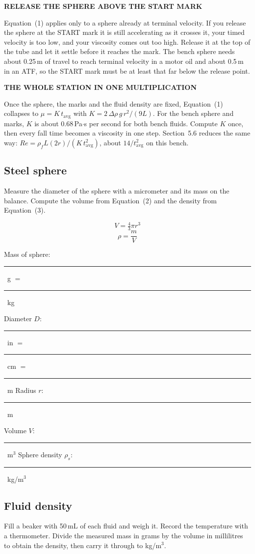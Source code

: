 \documentclass[11pt,a4paper]{article}
\newcommand{\bl}{\rule[-0.35em]{1.6cm}{0.4pt}}
\newcommand{\bll}{\rule[-0.35em]{2.6cm}{0.4pt}}
\newcommand{\noteh}[1]{{\footnotesize\bfseries\sffamily\color{ink3}\MakeUppercase{#1}}\par\vspace{2pt}}
\newcommand{\cautionh}[1]{{\footnotesize\bfseries\sffamily\color{cautionrule}\MakeUppercase{#1}}\par\vspace{2pt}}
\begin{document}
\begin{labcaution}
\cautionh{Release the sphere above the START mark}
Equation~(1) applies only to a sphere already at terminal velocity. If you release the sphere at
the START mark it is still accelerating as it crosses it, your timed velocity is too low, and
your viscosity comes out too high. Release it at the top of the tube and let it settle before it
reaches the mark. The bench sphere needs about 0.25\,m of travel to reach terminal velocity in a
motor oil and about 0.5\,m in an ATF, so the START mark must be at least that far below the
release point.
\end{labcaution}

\begin{labnote}
\noteh{The whole station in one multiplication}
Once the sphere, the marks and the fluid density are fixed, Equation~(1) collapses to
$\mu = K\,t_\mathrm{avg}$ with $K = 2\,\Delta\rho\,g\,r^2/(9L)$. For the bench sphere and marks, $K$
is about 0.68\,Pa$\cdot$s per second for both bench fluids. Compute $K$ once, then every fall time
becomes a viscosity in one step. Section~5.6 reduces the same way:
$\mathit{Re} = \rho_f L (2r)/(K\,t_\mathrm{avg}^2)$, about $14/t_\mathrm{avg}^2$ on this bench.
\end{labnote}

\subsection{Steel sphere}
Measure the diameter of the sphere with a micrometer and its mass on the balance. Compute the
volume from Equation~(2) and the density from Equation~(3).

\begin{equation}
  V = \tfrac{4}{3}\pi r^{3}
\end{equation}
\begin{equation}
  \rho = \frac{m}{V}
\end{equation}

\noindent Mass of sphere: \bl\ g $=$ \bl\ kg \par
\smallskip
\noindent Diameter $D$: \bl\ in $=$ \bl\ cm $=$ \bl\ m \hfill Radius $r$: \bl\ m \par
\smallskip
\noindent Volume $V$: \bll\ m$^3$ \hfill Sphere density $\rho_s$: \bll\ kg/m$^3$ \par

\subsection{Fluid density}
Fill a beaker with 50\,mL of each fluid and weigh it. Record the temperature with a thermometer.
Divide the measured mass in grams by the volume in millilitres to obtain the density, then carry
it through to kg/m$^3$.
\end{document}
